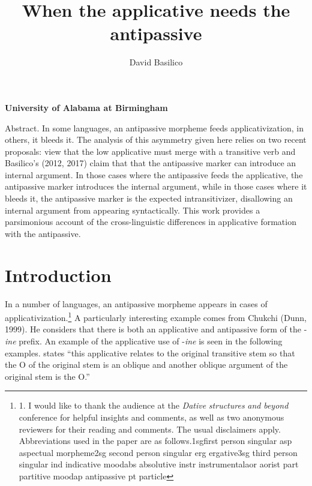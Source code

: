 \documentclass[output=paper,modfonts,nonflat]{langsci/langscibook}
\author{David Basilico\affiliation{}}
\title{When the applicative needs the antipassive}
\begin{document}
\maketitle  

\begin{stylelsAbstract}
\textbf{\textup{University} \textbf{of} \textbf{Alabama} \textbf{at} \textbf{Birmingham} }
\end{stylelsAbstract}

\begin{stylelsAbstract}
Abstract. In some languages, an antipassive morpheme feeds applicativization, in others, it bleeds it.  The analysis of this asymmetry given here relies on two recent proposals:  view that the low applicative must merge with a transitive verb and Basilico’s (2012, 2017) claim that that the antipassive marker can introduce an internal argument.  In those cases where the antipassive feeds the applicative, the antipassive marker introduces the internal argument, while in those cases where it bleeds it, the antipassive marker is the expected intransitivizer, disallowing an internal argument from appearing syntactically.  This work provides a parsimonious account of the cross-linguistic differences in applicative formation with the antipassive.
\end{stylelsAbstract}

\section{Introduction} %

In a number of languages, an antipassive morpheme appears in cases of applicativization.\footnote{1.  I would like to thank the audience at the \textit{Dative} \textit{structures} \textit{and} \textit{beyond} conference for helpful insights and comments, as well as two anonymous reviewers for their reading and comments.  The usual disclaimers apply.  Abbreviations used in the paper are as follows.1\textrm{sg}first person singular      \textrm{asp}  aspectual morpheme2s\textrm{g}  second person singular      \textrm{erg}  ergative3\textrm{sg}  third person singular      \textrm{ind}  indicative mood\textrm{abs}  absolutive        \textrm{instr}  instrumental\textrm{aor}  aorist          \textrm{part}  partitive mood\textrm{ap}  antipassive        \textrm{pt}  particle} A particularly interesting example comes from Chukchi (Dunn, 1999).  He considers that there is both an applicative and antipassive form of the -\textit{ine} prefix. An example of the applicative use of -\textit{ine} is seen in the following examples.  \citet[214]{Dunn1999} states “this applicative relates to the original transitive stem so that the O of the original stem is an oblique and another oblique argument of the original stem is the O.” 
\end{document}
